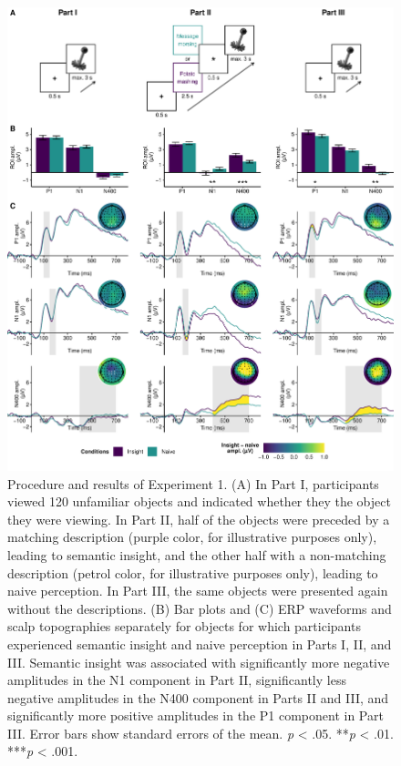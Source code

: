 \documentclass[
  english,
  man,11pt,floatsintext]{apa7}
\begin{document}
\begin{figure}

{\centering \includegraphics{manuscript_files/figure-latex/exp1-plot-1} 

}

\caption{Procedure and results of Experiment 1. (A) In Part I, participants viewed 120 unfamiliar objects and indicated whether they the object they were viewing. In Part II, half of the objects were preceded by a matching description (purple color, for illustrative purposes only), leading to semantic insight, and the other half with a non-matching description (petrol color, for illustrative purposes only), leading to naive perception. In Part III, the same objects were presented again without the descriptions. (B) Bar plots and (C) ERP waveforms and scalp topographies separately for objects for which participants experienced semantic insight and naive perception in Parts I, II, and III. Semantic insight was associated with significantly more negative amplitudes in the N1 component in Part II, significantly less negative amplitudes in the N400 component in Parts II and III, and significantly more positive amplitudes in the P1 component in Part III. Error bars show standard errors of the mean. \newline*\emph{p} \textless{} .05. **\emph{p} \textless{} .01. ***\emph{p} \textless{} .001.}\label{fig:exp1-plot}
\end{figure}
\end{document}
